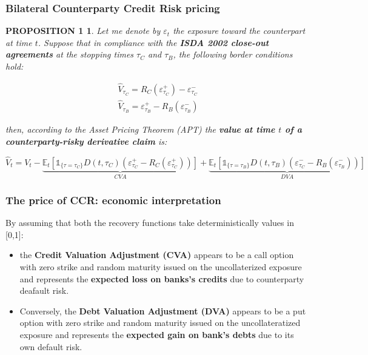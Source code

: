 \documentclass{beamer}
\begin{document}
\begin{frame}
\frametitle{Bilateral Counterparty Credit Risk pricing}
	\newtheorem{prop}{PROPOSITION 1}
	\begin{prop}
	Let me denote by $\varepsilon_{t}$ the exposure toward the counterpart at time $t$. Suppose that in compliance with the \textbf{ISDA 2002 close-out agreements} at the stopping times $\tau_{C}$ and $\tau_{B}$, the following border conditions hold:
	
	\begin{equation}\label{ISDA}
	\begin{split}
		\hat{V}_{\tau_{C}} = R_{C}(\varepsilon^{+}_{\tau_{C}}) - \varepsilon^{-}_{\tau_{C}} \\
		\hat{V}_{\tau_{B}} =\varepsilon^{+}_{\tau_{B}}- R_{B}(\varepsilon^{-}_{\tau_{B}})
	\end{split}
	\end{equation}

	then, according to the Asset Pricing Theorem (APT) the \textbf{value at time $t$ of a counterparty-risky derivative claim} is:
	
	\footnotesize {
	\begin{equation}\label{BVA}
		\hat{V}_t= V_t -  \underbrace{\mathbb{E}_{t}[ \mathds{1}_{ \{ \tau = \tau_{C} \} } D(t,\tau_{C}) (\varepsilon_{\tau_{C}}^{+}- R_{C}(\varepsilon_{\tau_{C}}^{+}))]}_{CVA}+ \underbrace{ \mathbb{E}_{t}[ \mathds{1}_{ \{ \tau = \tau_{B} \} } D(t,\tau_{B}) (\varepsilon_{\tau_{C}}^{-}- R_{B}(\varepsilon_{\tau_{B}}^{-}))] }_{DVA}
	\end{equation} }

	\end{prop}
\end{frame}

\begin{frame}
\frametitle{The price of CCR: economic interpretation}
	By assuming that both the recovery functions take deterministically values in [0,1]:
	\begin{itemize}
		\item the \textbf{Credit Valuation Adjustment (CVA)} appears to be a call option with zero strike and random maturity issued on the uncollaterized exposure and represents the \textbf{expected loss on banks's credits} due to counterparty deafault risk.
		
		\item Conversely, the \textbf{Debt Valuation Adjustment (DVA)} appears to be a put option with zero strike and random maturity issued on the uncollateratized exposure and represents the \textbf{expected gain on bank's debts} due to its own default risk.
	\end{itemize}
\end{frame}
\end{document}
